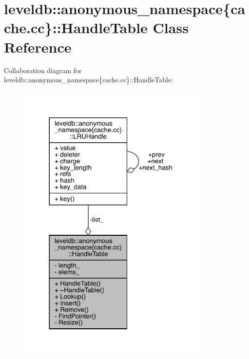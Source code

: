 \hypertarget{classleveldb_1_1anonymous__namespace_02cache_8cc_03_1_1_handle_table}{}\section{leveldb\+:\+:anonymous\+\_\+namespace\{cache.\+cc\}\+:\+:Handle\+Table Class Reference}
\label{classleveldb_1_1anonymous__namespace_02cache_8cc_03_1_1_handle_table}


Collaboration diagram for leveldb\+:\+:anonymous\+\_\+namespace\{cache.\+cc\}\+:\+:Handle\+Table\+:
\nopagebreak
\begin{figure}[H]
\begin{center}
\leavevmode
\includegraphics[width=269pt]{classleveldb_1_1anonymous__namespace_02cache_8cc_03_1_1_handle_table__coll__graph}
\end{center}
\end{figure}
